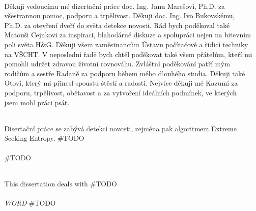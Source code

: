  \vspace*{\fill}
  \\ [5mm]
Děkuji vedoucímu mé dizertační práce doc. Ing. Janu Marešovi, Ph.D. za všestrannou pomoc, podporu a trpělivost. Děkuji doc. Ing. Ivo Bukovskému, Ph.D.  za otevření dveří do světa detekce novosti. Rád bych poděkoval také Matouši Cejnkovi za inspiraci, blahodárné diskuze a spolupráci nejen na bitevním poli světa H\&G. Děkuji všem zaměstnancům Ústavu počítačové a řídicí techniky na VŠCHT. V neposlední řadě bych chtěl poděkovat také všem přátelům, kteří mi pomohli udržet zdravou životní rovnováhu. Zvláštní poděkování patří  mým rodičům a sestře Radaně za podporu během mého dlouhého studia. Děkuji také Otovi, který mi přinesl spoustu štěstí a radosti. Nejvíce děkuji mé Kazumi za podporu, trpělivost, obětavost a za vytvoření ideálních podmínek, ve kterých jsem mohl práci psát.  

 





\cleardoublepage
\thispagestyle{empty}

 \\ [5mm]
Disertační práce se zabývá detekcí novosti, zejména pak algoritmem Extreme Seeking Entropy. \#TODO \\ [5mm]
  \\ [5mm] 
\#TODO

\cleardoublepage
\thispagestyle{empty}


\cleardoublepage
\thispagestyle{empty}

 \\ [5mm] 
This dissertation deals with \#TODO
\\ [5mm]



  \\ [5mm]
{\it WORD}
\#TODO



\cleardoublepage
\tableofcontents
\thispagestyle{empty}

